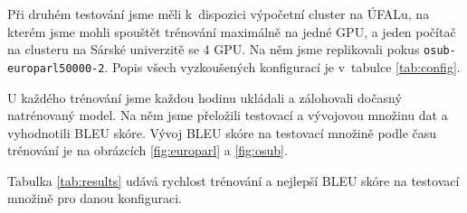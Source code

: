 \documentclass[a4]{article}
\begin{document}
Při druhém testování jsme měli k~dispozici výpočetní cluster na ÚFALu, na
kterém jsme mohli spouštět trénování maximálně na jedné GPU, a jeden počítač na
clusteru na Sárské univerzitě se 4 GPU. Na něm jsme replikovali pokus
\texttt{osub-europarl50000-2}. Popis všech vyzkoušených konfigurací je v~tabulce 
\ref{tab:config}. 

U každého trénování jsme každou hodinu ukládali a zálohovali dočasný natrénovaný
model. Na něm jsme přeložili testovací a vývojovou množinu dat a vyhodnotili
BLEU skóre. Vývoj BLEU skóre na testovací množině podle času trénování je na
obrázcích \ref{fig:europarl} a \ref{fig:osub}.


Tabulka \ref{tab:results} udává rychlost trénování a nejlepší BLEU skóre na testovací
množině pro danou konfiguraci.

\end{document}

